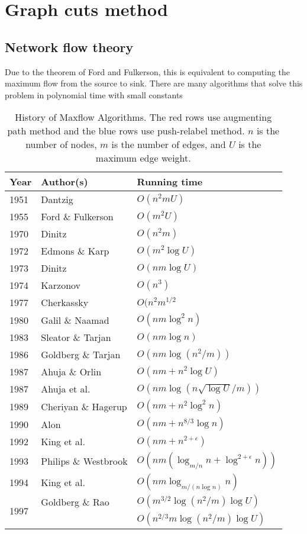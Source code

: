 \section{Graph cuts method}
\subsection{Network flow theory}
Due to the theorem of Ford and Fulkerson\cite{ford1963flows}, this is equivalent to computing the maximum flow from the source to sink. There are many algorithms that solve this problem in polynomial time with small constants \cite{ahuja1993network,boykov2004experimental,goldberg1988new}
\begin{table}
  \caption{History of Maxflow Algorithms. The red rows use augmenting path method and the blue rows use push-relabel method. $n$ is the number of nodes, $m$ is the number of edges, and $U$ is the maximum edge weight.}
\begin{center}
 \begin{tabular}{| l | l | l |}
    \hline
    Year & Author(s) & Running time \\ \hline 
    1951 & Dantzig & $O(n^2mU)$ \\ \hline
	1955 & Ford \& Fulkerson & $O(m^2U)$ \\ \hline
	1970 & Dinitz & \color{red}$O(n^2m)$\\ \hline
	1972 & Edmons \& Karp & $O(m^2\log U)$\\ \hline
	1973 & Dinitz & \color{red}$O(nm\log U)$ \\ \hline
	1974 & Karzonov & \color{red}$O(n^3)$ \\ \hline
	1977 & Cherkassky & \color{red}$O(n^2m^{1/2}$ \\ \hline
	1980 & Galil \& Naamad & \color{red}$O(nm\log^2n)$ \\ \hline
	1983 & Sleator \& Tarjan & \color{red}$O(nm\log n)$ \\  \hline
	1986 & Goldberg \& Tarjan & \color{blue}$O(nm\log(n^2/m))$ \\ \hline
	1987 & Ahuja \& Orlin & \color{blue}$O(nm + n^2\log U)$ \\ \hline
	1987 & Ahuja et al. & \color{blue}$O(nm\log (n\sqrt{\log U}/m))$\\ \hline
	1989 & Cheriyan \& Hagerup & \color{blue}$O(nm + n^2 \log^2n)$\\ \hline
	1990 & Alon & \color{blue}$O(nm + n^{8/3}\log n)$\\ \hline
	1992 & King et al. & \color{blue}$O(nm + n^{2+\epsilon})$\\ \hline
	1993 & Philips \& Westbrook & \color{blue}$O(nm (\log_{m/n}n + \log^{2+\epsilon}n))$\\ \hline
	1994 & King et al. & \color{blue}$O(nm\log_{m/(n\log n)}n)$ \\ \hline
	\multirow{2}{*}{1997} & Goldberg \& Rao & \color{red}$O(m^{3/2}\log(n^2/m)\log U)$ \\
	 & & \color{red}$O(n^{2/3}m\log(n^2/m)\log U)$\\ \hline
    \end{tabular}
\end{center}
\end{table}
